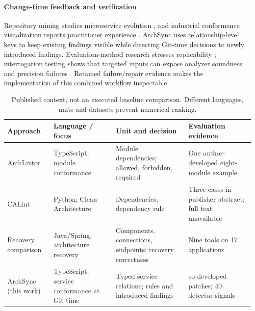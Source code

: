 \begin{sloppypar}
\paragraph{Change-time feedback and verification} Repository mining studies microservice evolution \cite{evolution2024}, and industrial conformance visualization reports practitioner experience \cite{thermofisher2025}. ArchSync uses relationship-level keys to keep existing findings visible while directing Git-time decisions to newly introduced findings. Evaluation-method research stresses replicability \cite{konersmann2022replicability}; interrogation testing shows that targeted inputs can expose analyzer soundness and precision failures \cite{kaindlstorfer2024interrogation}. Retained failure/repair evidence makes the implementation of this combined workflow inspectable.
\end{sloppypar}

\begin{table}[t]
\caption{Published context, not an executed baseline comparison. Different languages, units and datasets prevent numerical ranking.}
\label{tab:external}
\centering
\begin{tabular}{@{}>{\raggedright\arraybackslash}p{.16\linewidth}>{\raggedright\arraybackslash}p{.24\linewidth}>{\raggedright\arraybackslash}p{.27\linewidth}>{\raggedright\arraybackslash}p{.25\linewidth}@{}}
\toprule
Approach & Language / focus & Unit and decision & Evaluation evidence\\\midrule
ArchLintor \cite{archlintor2025} & TypeScript; module conformance & Module dependencies; allowed, forbidden, required & One author-developed eight-module example\\
CALint \cite{calint2022} & Python; Clean Architecture & Dependencies; dependency rule & Three cases in publisher abstract; full text unavailable\\
Recovery comparison \cite{schneider2025comparison} & Java/Spring; architecture recovery & Components, connections, endpoints; recovery correctness & Nine tools on 17 applications\\
ArchSync (this work) & TypeScript; service conformance at Git time & Typed service relations; rules and introduced findings & 20 co-developed patches; 40 detector signals\\\bottomrule
\end{tabular}
\end{table}

